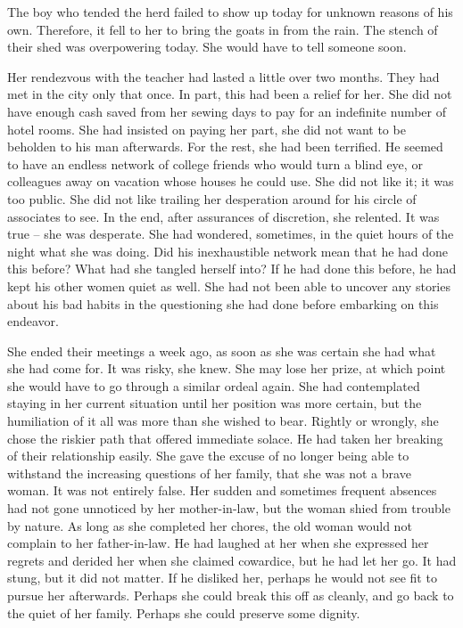 \documentclass{article}
\begin{document}
\vspace{.5cm}

The boy who tended the herd failed to show up today for unknown reasons of his own. Therefore, it fell to her to bring the goats in from the rain. The stench of their shed was overpowering today. She would have to tell someone soon.

Her rendezvous with the teacher had lasted a little over two months. They had met in the city only that once. In part, this had been a relief for her. She did not have enough cash saved from her sewing days to pay for an indefinite number of hotel rooms. She had insisted on paying her part, she did not want to be beholden to his man afterwards. For the rest, she had been terrified. He seemed to have an endless network of college friends who would turn a blind eye, or colleagues away on vacation whose houses he could use. She did not like it; it was too public. She did not like trailing her desperation around for his circle of associates to see. In the end, after assurances of discretion, she relented. It was true -- she was desperate.  She had wondered, sometimes, in the quiet hours of the night what she was doing. Did his inexhaustible network mean that he had done this before? What had she tangled herself into? If he had done this before, he had kept his other women quiet as well. She had not been able to uncover any stories about his bad habits in the questioning she had done before embarking on this endeavor.

She ended their meetings a week ago, as soon as she was certain she had what she had come for. It was risky, she knew. She may lose her prize, at which point she would have to go through a similar ordeal again. She had contemplated staying in her current situation until her position was more certain, but the humiliation of it all was more than she wished to bear. Rightly or wrongly, she chose the riskier path that offered immediate solace. He had taken her breaking of their relationship easily. She gave the excuse of no longer being able to withstand the increasing questions of her family, that she was not a brave woman. It was not entirely false. Her sudden and sometimes frequent absences had not gone unnoticed by her mother-in-law, but the woman shied from trouble by nature. As long as she completed her chores, the old woman would not complain to her father-in-law. He had laughed at her when she expressed her regrets and derided her when she claimed cowardice, but he had let her go. It had stung, but it did not matter. If he disliked her, perhaps he would not see fit to pursue her afterwards. Perhaps she could break this off as cleanly, and go back to the quiet of her family. Perhaps she could preserve some dignity.
\end{document}
